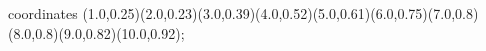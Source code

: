 					coordinates { (1.0,0.25)(2.0,0.23)(3.0,0.39)(4.0,0.52)(5.0,0.61)(6.0,0.75)(7.0,0.8)(8.0,0.8)(9.0,0.82)(10.0,0.92)};